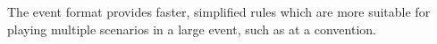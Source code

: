 The event format provides faster, simplified rules which are more suitable for playing multiple scenarios in a large event, such as at a convention.
